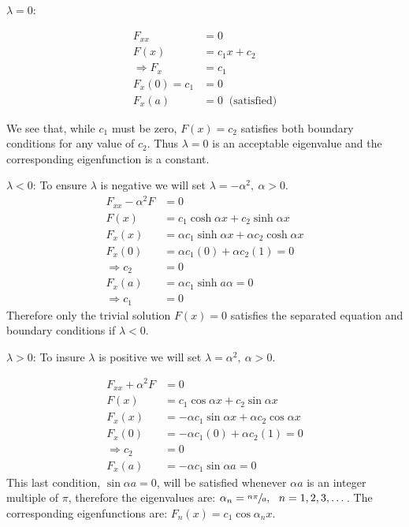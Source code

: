 \vspace{0.1cm}

\noindent\underline{$\lambda = 0$}:

\begin{align*}
F_{xx} &= 0 \\
F(x) &= c_1x + c_2 \\
\Rightarrow F_{x} &= c_1 \\
F_x(0) = c_1 &= 0 \\ 
F_{x}(a) &= 0 \ \text{ (satisfied)}
\end{align*}

\vspace{0.1cm}

\noindent We see that, while $c_1$ must be zero, $F(x)=c_2$ satisfies both boundary conditions for any value of $c_2$.  Thus $\lambda = 0$ is an acceptable eigenvalue and the corresponding eigenfunction is a constant.

\vspace{0.1cm}

\noindent\underline{$\lambda < 0$}: To ensure $\lambda$ is negative we will set $\lambda = -\alpha^2, \ \alpha>0$.
\begin{align*}
F_{xx} - \alpha^2 F &= 0 \\
F(x) &= c_1 \cosh{\alpha x} + c_2 \sinh{\alpha x} \\
F_x(x) &= \alpha c_1 \sinh{\alpha x} + \alpha c_2 \cosh{\alpha x} \\
F_x(0) &= \alpha c_1 (0) + \alpha c_2 (1) = 0 \\
\Rightarrow c_2 &= 0 \\
F_x(a) &= \alpha c_1 \sinh{a \alpha} = 0\\
\Rightarrow c_1 &= 0
\end{align*}
Therefore only the trivial solution $F(x)=0$ satisfies the separated equation and boundary conditions if $\lambda < 0$.

\vspace{0.5cm}

\noindent\underline{$\lambda > 0$}: To insure $\lambda$ is positive we will set $\lambda = \alpha^2, \ \alpha>0$.

\begin{align*}
F_{xx}+\alpha^2 F &= 0 \\
F(x) &= c_1 \cos{\alpha x} + c_2 \sin{\alpha x} \\
F_{x}(x) &= -\alpha c_1 \sin{\alpha x} + \alpha c_2 \cos{\alpha x} \\
F_{x}(0) &= -\alpha c_1 (0) + \alpha c_2 (1) = 0 \\
\Rightarrow c_2 &= 0 \\
F_{x}(a) &= -\alpha c_1 \sin{\alpha a} = 0
\end{align*}
This last condition, $\sin{\alpha a} = 0$, will be satisfied whenever $\alpha a$ is an integer multiple of $\pi$, therefore the eigenvalues are: $\alpha_n = \sfrac{n \pi}{a}, \ \ n=1,2,3,\dots$.  The corresponding eigenfunctions are: $F_n(x) = c_1 \cos{\alpha_n x}$.

